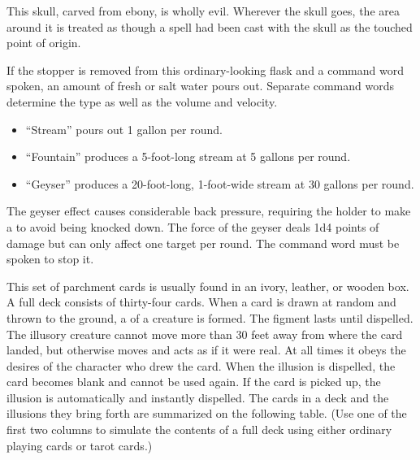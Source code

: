 {\begin{comment}
If a side is pressed twice in quick succession, the character so doing is transported to a random point on the other plane, along with all creatures in adjacent squares. (The other creatures may avoid this fate by succeeding on DR 23 Will saves).

Strong conjuration; CL 13th; Craft Wondrous Item, plane shift; Price 164,000 gp.
\end{comment}

 This skull, carved from ebony, is wholly evil. Wherever the skull goes, the area around it is treated as though a  spell had been cast with the skull as the touched point of origin.


 If the stopper is removed from this ordinary-looking flask and a command word spoken, an amount of fresh or salt water pours out. Separate command words determine the type as well as the volume and velocity.
\begin{itemize}
\item ``Stream'' pours out 1 gallon per round.
\item ``Fountain'' produces a 5-foot-long stream at 5 gallons per round.
\item ``Geyser'' produces a 20-foot-long, 1-foot-wide stream at 30 gallons per round.
\end{itemize}

The geyser effect causes considerable back pressure, requiring the holder to make a  to avoid being knocked down. The force of the geyser deals 1d4 points of damage but can only affect one target per round. The command word must be spoken to stop it.


 This set of parchment cards is usually found in an ivory, leather, or wooden box. A full deck consists of thirty-four cards. When a card is drawn at random and thrown to the ground, a  of a creature is formed. The figment lasts until dispelled. The illusory creature cannot move more than 30 feet away from where the card landed, but otherwise moves and acts as if it were real. At all times it obeys the desires of the character who drew the card. When the illusion is dispelled, the card becomes blank and cannot be used again. If the card is picked up, the illusion is automatically and instantly dispelled. The cards in a deck and the illusions they bring forth are summarized on the following table. (Use one of the first two columns to simulate the contents of a full deck using either ordinary playing cards or tarot cards.)

}
